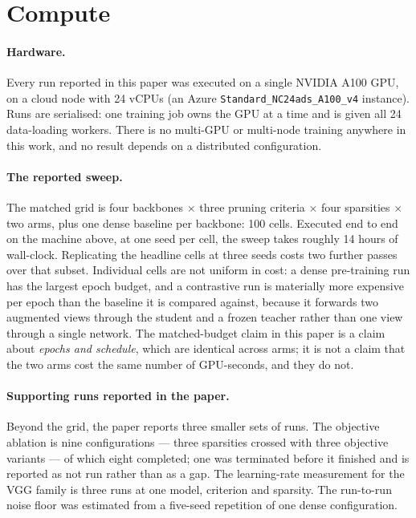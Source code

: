 %
%
%

\section{Compute}
\label{sec:stmt:compute}

\paragraph{Hardware.}
Every run reported in this paper was executed on a single NVIDIA A100 GPU, on a
cloud node with 24 vCPUs (an Azure \texttt{Standard\_NC24ads\_A100\_v4}
instance). Runs are serialised: one training job owns the GPU at a time and is
given all 24 data-loading workers. There is no multi-GPU or multi-node training
anywhere in this work, and no result depends on a distributed configuration.

\paragraph{The reported sweep.}
The matched grid is four backbones $\times$ three pruning criteria $\times$ four
sparsities $\times$ two arms, plus one dense baseline per backbone: 100 cells.
Executed end to end on the machine above, at one seed per cell, the sweep takes
roughly 14 hours of wall-clock. Replicating the headline cells at three seeds
costs two further passes over that subset. Individual cells are not uniform in
cost: a dense pre-training run has the largest epoch budget, and a contrastive
run is materially more expensive per epoch than the baseline it is compared
against, because it forwards two augmented views through the student and a
frozen teacher rather than one view through a single network. The matched-budget
claim in this paper is a claim about \emph{epochs and schedule}, which are
identical across arms; it is not a claim that the two arms cost the same number
of GPU-seconds, and they do not.

\paragraph{Supporting runs reported in the paper.}
Beyond the grid, the paper reports three smaller sets of runs. The objective
ablation is nine configurations --- three sparsities crossed with three
objective variants --- of which eight completed; one was terminated before it
finished and is reported as not run rather than as a gap. The learning-rate
measurement for the VGG family is three runs at one model, criterion and
sparsity. The run-to-run noise floor was estimated from a five-seed repetition
of one dense configuration.

